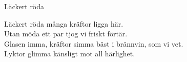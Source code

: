 \begin{song}{Läckert röda}
	
	
	
	Läckert röda många kräftor ligga här.\\
	Utan möda ett par tjog vi friskt förtär.\\
	Glasen imma, kräftor simma bäst i brännvin, som vi vet.\\
	Lyktor glimma känsligt mot all härlighet.
	
\end{song}
